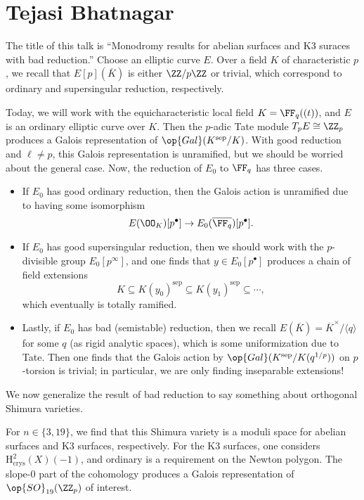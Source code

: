 \documentclass{article}
\begin{document}
\section{Tejasi Bhatnagar}
The title of this talk is ``Monodromy results for abelian surfaces and K3 suraces with bad reduction.'' Choose an elliptic curve $E$. Over a field $K$ of characteristic $p$, we recall that $E[p](\overline K)$ is either $\ZZ/p\ZZ$ or trivial, which correspond to ordinary and supersingular reduction, respectively.

Today, we will work with the equicharacteristic local field $K=\FF_q((t))$, and $E$ is an ordinary elliptic curve over $K$. Then the $p$-adic Tate module $T_pE\cong\ZZ_p$ produces a Galois representation of $\op{Gal}(K^{\mathrm{sep}}/K)$. With good reduction and $\ell\ne p$, this Galois representation is unramified, but we should be worried about the general case. Now, the reduction of $E_0$ to $\FF_q$ has three cases.
\begin{itemize}
	\item If $E_0$ has good ordinary reduction, then the Galois action is unramified due to having some isomorphism
	\[E(\OO_K)[p^\bullet]\to E_0(\overline{\FF_q})[p^\bullet].\]
	\item If $E_0$ has good supersingular reduction, then we should work with the $p$-divisible group $E_0[p^\infty]$, and one finds that $y\in E_0[p^\bullet]$ produces a chain of field extensions
	\[K\subseteq K(y_0)^{\mathrm{sep}}\subseteq K(y_1)^{\mathrm{sep}}\subseteq\cdots,\]
	which eventually is totally ramified.
	\item Lastly, if $E_0$ has bad (semistable) reduction, then we recall $E(\overline K)=\overline K^\times/\langle q\rangle$ for some $q$ (as rigid analytic spaces), which is some uniformization due to Tate. Then one finds that the Galois action by $\op{Gal}(K^{\mathrm{sep}}/K(q^{1/p}))$ on $p$-torsion is trivial; in particular, we are only finding inseparable extensions!
\end{itemize}
We now generalize the result of bad reduction to say something about orthogonal Shimura varieties.
\begin{remark}
	For $n\in\{3,19\}$, we find that this Shimura variety is a moduli space for abelian surfaces and K3 surfaces, respectively. For the K3 surfaces, one considers $\mathrm H^2_{\mathrm{crys}}(X)(-1)$, and ordinary is a requirement on the Newton polygon. The slope-$0$ part of the cohomology produces a Galois representation of $\op{SO}_{19}(\ZZ_p)$ of interest.
\end{remark}
\end{document}
